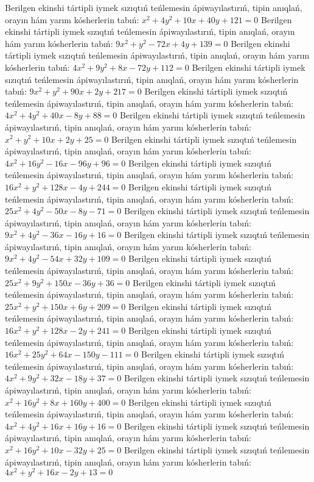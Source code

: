 Berilgen ekinshi tártipli iymek sızıqtıń teńlemesin ápiwayılastırıń, tipin anıqlań, orayın hám yarım kósherlerin tabıń: $x^2+4y^2+10x+40y+121=0$
Berilgen ekinshi tártipli iymek sızıqtıń teńlemesin ápiwayılastırıń, tipin anıqlań, orayın hám yarım kósherlerin tabıń: $9x^2+y^2-72x+4y+139=0$
Berilgen ekinshi tártipli iymek sızıqtıń teńlemesin ápiwayılastırıń, tipin anıqlań, orayın hám yarım kósherlerin tabıń: $4x^2+9y^2+8x-72y+112=0$
Berilgen ekinshi tártipli iymek sızıqtıń teńlemesin ápiwayılastırıń, tipin anıqlań, orayın hám yarım kósherlerin tabıń: $9x^2+y^2+90x+2y+217=0$
Berilgen ekinshi tártipli iymek sızıqtıń teńlemesin ápiwayılastırıń, tipin anıqlań, orayın hám yarım kósherlerin tabıń: $4x^2+4y^2+40x-8y+88=0$
Berilgen ekinshi tártipli iymek sızıqtıń teńlemesin ápiwayılastırıń, tipin anıqlań, orayın hám yarım kósherlerin tabıń: $x^2+y^2+10x+2y+25=0$
Berilgen ekinshi tártipli iymek sızıqtıń teńlemesin ápiwayılastırıń, tipin anıqlań, orayın hám yarım kósherlerin tabıń: $4x^2+16y^2-16x-96y+96=0$
Berilgen ekinshi tártipli iymek sızıqtıń teńlemesin ápiwayılastırıń, tipin anıqlań, orayın hám yarım kósherlerin tabıń: $16x^2+y^2+128x-4y+244=0$
Berilgen ekinshi tártipli iymek sızıqtıń teńlemesin ápiwayılastırıń, tipin anıqlań, orayın hám yarım kósherlerin tabıń: $25x^2+4y^2-50x-8y-71=0$
Berilgen ekinshi tártipli iymek sızıqtıń teńlemesin ápiwayılastırıń, tipin anıqlań, orayın hám yarım kósherlerin tabıń: $9x^2+4y^2-36x-16y+16=0$
Berilgen ekinshi tártipli iymek sızıqtıń teńlemesin ápiwayılastırıń, tipin anıqlań, orayın hám yarım kósherlerin tabıń: $9x^2+4y^2-54x+32y+109=0$
Berilgen ekinshi tártipli iymek sızıqtıń teńlemesin ápiwayılastırıń, tipin anıqlań, orayın hám yarım kósherlerin tabıń: $25x^2+9y^2+150x-36y+36=0$
Berilgen ekinshi tártipli iymek sızıqtıń teńlemesin ápiwayılastırıń, tipin anıqlań, orayın hám yarım kósherlerin tabıń: $25x^2+y^2+150x+6y+209=0$
Berilgen ekinshi tártipli iymek sızıqtıń teńlemesin ápiwayılastırıń, tipin anıqlań, orayın hám yarım kósherlerin tabıń: $16x^2+y^2+128x-2y+241=0$
Berilgen ekinshi tártipli iymek sızıqtıń teńlemesin ápiwayılastırıń, tipin anıqlań, orayın hám yarım kósherlerin tabıń: $16x^2+25y^2+64x-150y-111=0$
Berilgen ekinshi tártipli iymek sızıqtıń teńlemesin ápiwayılastırıń, tipin anıqlań, orayın hám yarım kósherlerin tabıń: $4x^2+9y^2+32x-18y+37=0$
Berilgen ekinshi tártipli iymek sızıqtıń teńlemesin ápiwayılastırıń, tipin anıqlań, orayın hám yarım kósherlerin tabıń: $x^2+16y^2+8x+160y+400=0$
Berilgen ekinshi tártipli iymek sızıqtıń teńlemesin ápiwayılastırıń, tipin anıqlań, orayın hám yarım kósherlerin tabıń: $4x^2+4y^2+16x+16y+16=0$
Berilgen ekinshi tártipli iymek sızıqtıń teńlemesin ápiwayılastırıń, tipin anıqlań, orayın hám yarım kósherlerin tabıń: $x^2+16y^2+10x-32y+25=0$
Berilgen ekinshi tártipli iymek sızıqtıń teńlemesin ápiwayılastırıń, tipin anıqlań, orayın hám yarım kósherlerin tabıń: $4x^2+y^2+16x-2y+13=0$

